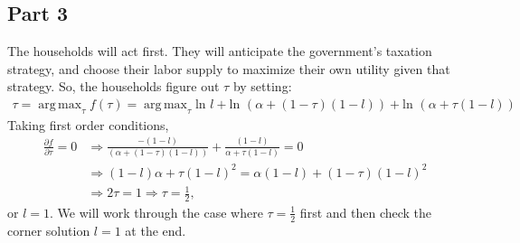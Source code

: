 \documentclass[11pt]{article} %
\DeclareMathOperator*{\argmax}{arg\,max}
\begin{document}

%

\subsection{Part 3}
The households will act first. They will anticipate the government's taxation strategy, and choose their labor supply to maximize their own utility given that strategy. So, the households figure out $\tau$ by setting:
\begin{align*}
\tau = \argmax_{\tau} f(\tau) = \argmax_{\tau} \text{ln }l +\text{ln }(\alpha + (1-\tau) (1-l)) +\text{ln }(\alpha + \tau(1-l)) 
\end{align*}
Taking first order conditions,
\begin{align*}
\frac{\partial f}{\partial \tau} = 0 &\Rightarrow \frac{-(1-l)}{(\alpha + (1-\tau) (1-l))} + \frac{(1-l)}{\alpha + \tau(1-l)} = 0\\
&\Rightarrow (1-l)\alpha + \tau (1-l)^2 = \alpha(1-l) + (1-\tau)(1-l)^2 \\
&\Rightarrow 2\tau = 1 \Rightarrow \tau = \frac{1}{2},
\end{align*}
or $l=1$. We will work through the case where $\tau=\frac{1}{2}$ first and then check the corner solution $l=1$ at the end.
\end{document}
